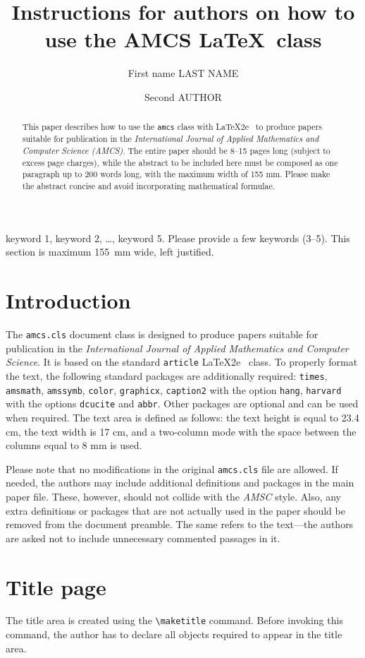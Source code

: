\documentclass{amcs}
\title{Instructions for authors on how to use the AMCS \LaTeX~class}
\author[ad1][]{First name LAST NAME}
\author[ad1][ad2]{Second AUTHOR}
\begin{document}
\begin{abstract}
This paper describes how to use the \verb+amcs+ class with \LaTeX2e
~to produce papers suitable for publication in the
\emph{International Journal of Applied Mathematics and Computer
Science (AMCS)}. The entire paper should be 8--15 pages long (subject to excess page charges), while the abstract to be included here must be composed as one paragraph up to 200 words long, with the maximum width of 155 mm. Please make the abstract concise and avoid incorporating mathematical formulae.
\end{abstract}
%
\begin{keywords}
keyword 1, keyword 2, \dots, keyword 5. Please provide a few keywords (3--5). This section is maximum 155~mm wide, left justified.
\end{keywords}
\maketitle

\section{Introduction}
The \verb+amcs.cls+ document class is designed to produce papers suitable for publication in the \emph{International Journal of Applied Mathematics and Computer Science}. It is based on the standard \verb+article+ \LaTeX2e ~class. To properly format the text, the following standard packages are additionally required: \verb+times+, \verb+amsmath+, \verb+amssymb+, \verb+color+, \verb+graphicx+, \verb+caption2+ with the option \verb+hang+, \verb+harvard+ with the options \verb+dcucite+ and \verb+abbr+. Other packages are optional and can be used when required. The text area is defined as follows: the text height is equal to 23.4 cm, the text width is 17 cm, and a two-column mode with the space between the columns equal to 8 mm is used.

Please note that no modifications in the original \verb+amcs.cls+ file are allowed. If needed, the authors may include additional definitions and packages in the main paper file. These, however, should not collide with the \emph{AMSC} style. Also, any extra definitions or packages that are not actually used in the paper should be removed from the document preamble. The same refers to the text---the authors are asked not to include unnecessary commented passages in it.

\section{Title page}
The title area is created using the \verb+\maketitle+ command. Before invoking this command, the author has to declare all objects required to appear in the title area.
\end{document}
